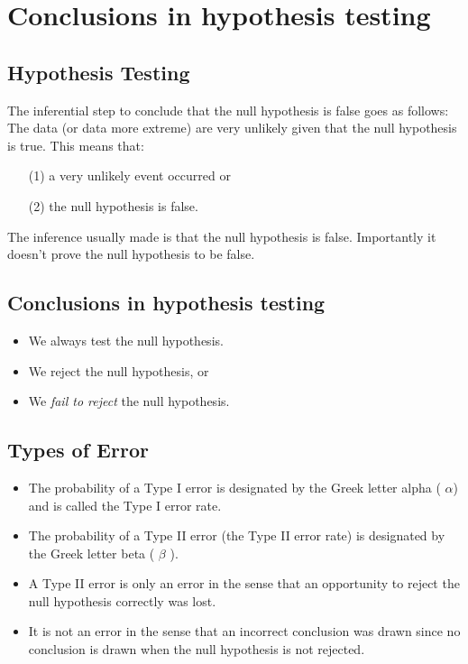 \documentclass[]{report}
\begin{document}
\section{Conclusions in hypothesis testing}


\subsection{Hypothesis Testing}
The inferential step to conclude that the null hypothesis is false goes as follows: The data (or data more extreme) are very unlikely given that the null hypothesis is true.
\bigskip
This means that:
\begin{itemize}
\item[(1)] a very unlikely event occurred or
\item[(2)] the null hypothesis is false.
\end{itemize}
\bigskip
The inference usually made is that the null hypothesis is false. Importantly it doesn't prove the null hypothesis to be false.



\subsection{Conclusions in hypothesis testing}
\begin{itemize}
\item We always test the null hypothesis.
\item We reject the null hypothesis, or
\item We \emph{ fail to reject} the null hypothesis.
\end{itemize}


\subsection{Types of Error}
\begin{itemize}
\item The probability of a Type I error is designated by the Greek letter alpha ( $\alpha$) and is called the Type I error rate.
\item The probability of a Type II error (the Type II error rate) is designated by the Greek letter beta ( $\beta$ ).
\item A Type II error is only an error in the sense that an opportunity to reject the null hypothesis correctly was lost.
\item It is not an error in the sense that an incorrect conclusion was drawn since no conclusion is drawn when the null hypothesis is not rejected.
\end{itemize}
\end{document}
